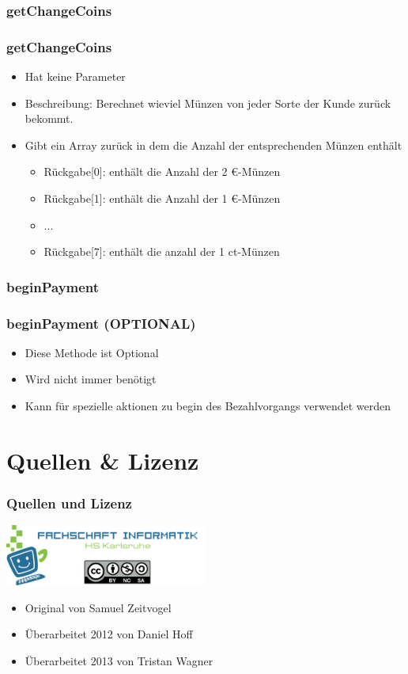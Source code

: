 \documentclass[final]{beamer}
\begin{document}
\subsubsection{getChangeCoins}
\begin{frame}
	\frametitle{getChangeCoins}
	\begin{itemize}
		\item{Hat keine Parameter}
		\item{Beschreibung:}
Berechnet wieviel Münzen von jeder Sorte der Kunde zurück bekommt.
		\item{Gibt ein Array zurück in dem die Anzahl der entsprechenden Münzen enthält}
			\begin{itemize}
				\item{Rückgabe[0]: enthält die Anzahl der 2 \euro-Münzen}
				\item{Rückgabe[1]: enthält die Anzahl der 1 \euro-Münzen}
				\item{...}
				\item{Rückgabe[7]: enthält die anzahl der 1 ct-Münzen}
			\end{itemize}
	\end{itemize}
\end{frame}

\subsubsection{beginPayment}
\begin{frame}
	\frametitle{beginPayment (OPTIONAL)}
	\begin{itemize}
		\item{Diese Methode ist Optional}
		\item{Wird nicht immer benötigt}
		\item{Kann für spezielle aktionen zu begin des Bezahlvorgangs verwendet werden}
	\end{itemize}
\end{frame}

\section{Quellen \& Lizenz}
\begin{frame}
	\frametitle{Quellen und Lizenz}
	\begin{center}
		\includegraphics[width=250px]{gfx/fsi}
	\end{center}
	\begin{itemize}
		\item{Original von Samuel Zeitvogel}
		\item{Überarbeitet 2012 von Daniel Hoff}
		\item{Überarbeitet 2013 von Tristan Wagner}
	\end{itemize}
\end{frame}
\end{document}
